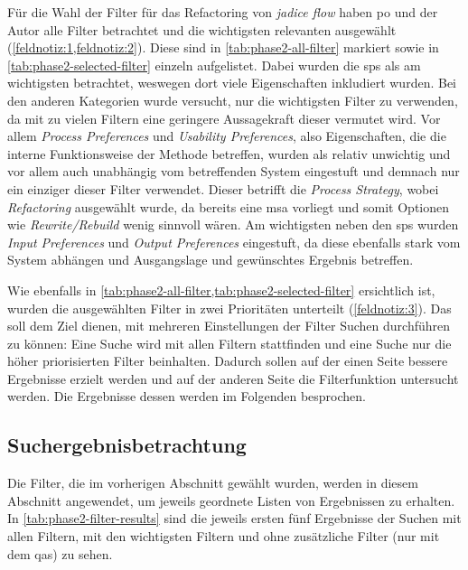 Für die Wahl der Filter für das Refactoring von \emph{jadice flow} haben \gls{po} und der Autor alle Filter betrachtet und die wichtigsten relevanten ausgewählt (\cref{feldnotiz:1,feldnotiz:2}).
Diese sind in \cref{tab:phase2-all-filter} markiert sowie in \cref{tab:phase2-selected-filter} einzeln aufgelistet.
Dabei wurden die \glspl{sp} als am wichtigsten betrachtet, weswegen dort viele Eigenschaften inkludiert wurden.
Bei den anderen Kategorien wurde versucht, nur die wichtigsten Filter zu verwenden, da mit zu vielen Filtern eine geringere Aussagekraft dieser vermutet wird.
Vor allem \emph{Process Preferences} und \emph{Usability Preferences}, also Eigenschaften, die die interne Funktionsweise der Methode betreffen, wurden als relativ unwichtig und vor allem auch unabhängig vom betreffenden System eingestuft und demnach nur ein einziger dieser Filter verwendet.
Dieser betrifft die \emph{Process Strategy}, wobei \emph{Refactoring} ausgewählt wurde, da bereits eine \gls{msa} vorliegt und somit Optionen wie \emph{Rewrite/Rebuild} wenig sinnvoll wären.
Am wichtigsten neben den \glspl{sp} wurden \emph{Input Preferences} und \emph{Output Preferences} eingestuft, da diese ebenfalls stark vom System abhängen und Ausgangslage und gewünschtes Ergebnis betreffen.



Wie ebenfalls in \cref{tab:phase2-all-filter,tab:phase2-selected-filter} ersichtlich ist, wurden die ausgewählten Filter in zwei Prioritäten unterteilt (\cref{feldnotiz:3}).
Das soll dem Ziel dienen, mit mehreren Einstellungen der Filter Suchen durchführen zu können:
Eine Suche wird mit allen Filtern stattfinden und eine Suche nur die höher priorisierten Filter beinhalten.
Dadurch sollen auf der einen Seite bessere Ergebnisse erzielt werden und auf der anderen Seite die Filterfunktion untersucht werden.
Die Ergebnisse dessen werden im Folgenden besprochen.

\subsection{Suchergebnisbetrachtung}
\label{sec:phase2-ergebnisdurchsicht}

Die Filter, die im vorherigen Abschnitt gewählt wurden, werden in diesem Abschnitt angewendet, um jeweils geordnete Listen von Ergebnissen zu erhalten.
In \cref{tab:phase2-filter-results} sind die jeweils ersten fünf Ergebnisse der Suchen mit allen Filtern, mit den wichtigsten Filtern und ohne zusätzliche Filter (nur mit dem \glspl{qa}) zu sehen.

